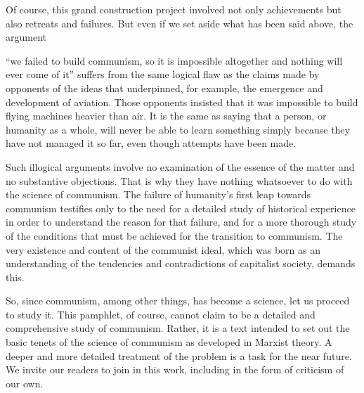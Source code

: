 \documentclass[../main]{subfiles}
\begin{document}
Of course, this grand construction project involved not only achievements but also retreats and failures. But even if we set aside what has been said above, the argument

“we failed to build communism, so it is impossible altogether and nothing will ever come of it” suffers from the same logical flaw as the claims made by opponents of the ideas that underpinned, for example, the emergence and development of aviation. Those opponents insisted that it was impossible to build flying machines heavier than air. It is the same as saying that a person, or humanity as a whole, will never be able to learn something simply because they have not managed it so far, even though attempts have been made.

Such illogical arguments involve no examination of the essence of the matter and no substantive objections. That is why they have nothing whatsoever to do with the science of communism. The failure of humanity’s first leap towards communism testifies only to the need for a detailed study of historical experience in order to understand the reason for that failure, and for a more thorough study of the conditions that must be achieved for the transition to communism. The very existence and content of the communist ideal, which was born as an understanding of the tendencies and contradictions of capitalist society, demands this.

So, since communism, among other things, has become a science, let us proceed to study it. This pamphlet, of course, cannot claim to be a detailed and comprehensive study of communism. Rather, it is a text intended to set out the basic tenets of the science of communism as developed in Marxist theory. A deeper and more detailed treatment of the problem is a task for the near future. We invite our readers to join in this work, including in the form of criticism of our own.
\end{document}

